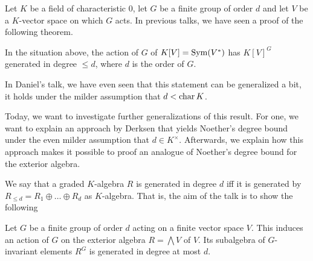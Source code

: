\documentclass[../main.tex]{subfiles}
\begin{document}
Let $K$ be a field of characteristic $0$, let $G$ be a finite group of order $d$
and let $V$ be a $K$-vector space on which $G$ acts. In previous talks, we have 
seen a proof of the following theorem.

\begin{thm} \label{thm:classical}
    In the situation above, the action of $G$ of $K[V] = \operatorname{Sym}(V^*)$ has $K[V]^G$ generated
    in degree $\leq d$, where $d$ is the order of $G$.
\end{thm}

In Daniel's talk, we have even seen that this statement can be generalized a bit,
it holds under the milder assumption that $d < \operatorname{char} K$. 

Today, we want to investigate further generalizations of this result. 
For one, we want to explain an approach by Derksen \cite{DERKSENProofIdea} that
yields Noether's degree bound under the even milder assumption that $d \in
K^\times$. Afterwards, we explain how this approach makes it possible to
proof an analogue of Noether's degree bound for the exterior algebra.

We say that a graded
$K$-algebra $R$ is generated in degree $d$ iff it is generated by $R_{\leq d} =
R_1 \oplus \dots \oplus R_d$ as $K$-algebra.  
That is, the aim of the talk is to show the following 

\begin{thm}\label{thm:mainthm}
    Let $G$ be a finite group of order $d$ acting on a finite vector space $V$.
    This induces an action of $G$ on the exterior algebra $R = \bigwedge V$ of $V$.
    Its subalgebra of $G$-invariant elements $R^G$ is generated in
    degree at most $d$.
\end{thm}

\end{document}
